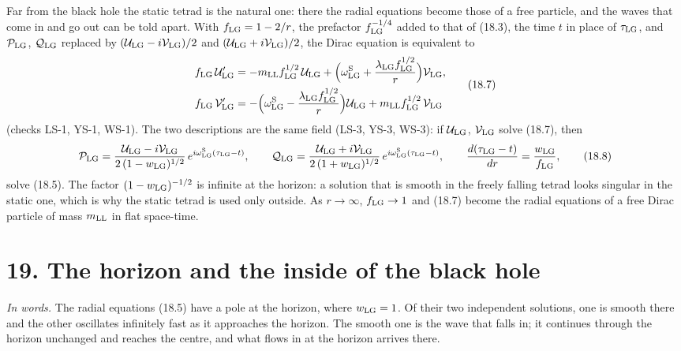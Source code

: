 \documentclass[
  10pt,
]{article}
\begin{document}
Far from the black hole the static tetrad is the natural one: there the
radial equations become those of a free particle, and the waves that
come in and go out can be told apart. With \(f_{\rm LG}=1-2/r\), the
prefactor \(f_{\rm LG}^{-1/4}\) added to that of (18.3), the time \(t\)
in place of \(\tau_{\rm LG}\), and \(\mathcal P_{\rm LG}\),
\(\mathcal Q_{\rm LG}\) replaced by
\((\mathcal U_{\rm LG}-i\mathcal V_{\rm LG})/2\) and
\((\mathcal U_{\rm LG}+i\mathcal V_{\rm LG})/2\), the Dirac equation is
equivalent to
\[\begin{aligned}f_{\rm LG}\,\mathcal U_{\rm LG}'&=-m_{\rm LL}f_{\rm LG}^{1/2}\,\mathcal U_{\rm LG}+\Big(\omega^{\rm S}_{\rm LG}+\frac{\lambda_{\rm LG}f_{\rm LG}^{1/2}}r\Big)\mathcal V_{\rm LG},\\f_{\rm LG}\,\mathcal V_{\rm LG}'&=-\Big(\omega^{\rm S}_{\rm LG}-\frac{\lambda_{\rm LG}f_{\rm LG}^{1/2}}r\Big)\mathcal U_{\rm LG}+m_{\rm LL}f_{\rm LG}^{1/2}\,\mathcal V_{\rm LG}\end{aligned}\tag{18.7}\]
(checks LS-1, YS-1, WS-1). The two descriptions are the same field
(LS-3, YS-3, WS-3): if \(\mathcal U_{\rm LG}\), \(\mathcal V_{\rm LG}\)
solve (18.7), then
\[\mathcal P_{\rm LG}=\frac{\mathcal U_{\rm LG}-i\mathcal V_{\rm LG}}{2\,(1-w_{\rm LG})^{1/2}}\,e^{i\omega^{\rm S}_{\rm LG}(\tau_{\rm LG}-t)},\qquad\mathcal Q_{\rm LG}=\frac{\mathcal U_{\rm LG}+i\mathcal V_{\rm LG}}{2\,(1+w_{\rm LG})^{1/2}}\,e^{i\omega^{\rm S}_{\rm LG}(\tau_{\rm LG}-t)},\qquad\frac{d(\tau_{\rm LG}-t)}{dr}=\frac{w_{\rm LG}}{f_{\rm LG}},\tag{18.8}\]
solve (18.5). The factor \((1-w_{\rm LG})^{-1/2}\) is infinite at the
horizon: a solution that is smooth in the freely falling tetrad looks
singular in the static one, which is why the static tetrad is used only
outside. As \(r\to\infty\), \(f_{\rm LG}\to1\) and (18.7) become the
radial equations of a free Dirac particle of mass \(m_{\rm LL}\) in flat
space-time.

\hypertarget{the-horizon-and-the-inside-of-the-black-hole}{%
\section{19. The horizon and the inside of the black
hole}\label{the-horizon-and-the-inside-of-the-black-hole}}

\emph{In words.} The radial equations (18.5) have a pole at the horizon,
where \(w_{\rm LG}=1\). Of their two independent solutions, one is
smooth there and the other oscillates infinitely fast as it approaches
the horizon. The smooth one is the wave that falls in; it continues
through the horizon unchanged and reaches the centre, and what flows in
at the horizon arrives there.
\end{document}
